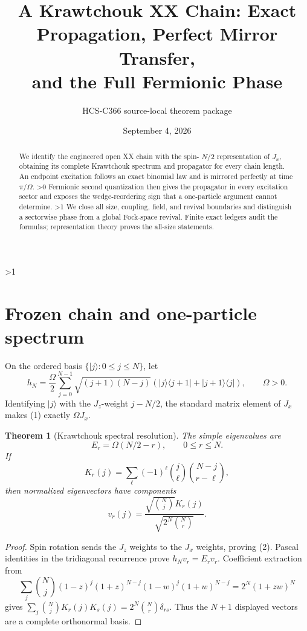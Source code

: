 \documentclass[10pt]{article}
\title{A Krawtchouk XX Chain: Exact Propagation, Perfect Mirror Transfer,\\
and the Full Fermionic Phase}
\author{HCS-C366 source-local theorem package}
\date{September 4, 2026}
\newtheorem{theorem}{Theorem}
\providecommand{\CRevisionRound}{2}
\begin{document}
\maketitle

\begin{abstract}
We identify the engineered open XX chain with the spin-
\(N/2\) representation of \(J_x\), obtaining its complete Krawtchouk spectrum
and propagator for every chain length.  An endpoint excitation follows an
exact binomial law and is mirrored perfectly at time \(\pi/\Omega\).
\ifnum\CRevisionRound>0
Fermionic second quantization then gives the propagator in every excitation
sector and exposes the wedge-reordering sign that a one-particle argument
cannot determine.
\fi
\ifnum\CRevisionRound>1
We close all size, coupling, field, and revival boundaries and distinguish a
sectorwise phase from a global Fock-space revival.
\fi
Finite exact ledgers audit the formulas; representation theory proves the
all-size statements.
\end{abstract}
\ifnum\CRevisionRound>1
\small
\fi

\section{Frozen chain and one-particle spectrum}
On the ordered basis \(\{|j\rangle:0\le j\le N\}\), let
\begin{equation}
h_N=\frac{\Omega}{2}\sum_{j=0}^{N-1}\sqrt{(j+1)(N-j)}
 (|j\rangle\langle j+1|+|j+1\rangle\langle j|),\qquad \Omega>0.
\end{equation}
Identifying \(|j\rangle\) with the \(J_z\)-weight \(j-N/2\), the standard
matrix element of \(J_x\) makes (1) exactly \(\Omega J_x\).

\begin{theorem}[Krawtchouk spectral resolution]
The simple eigenvalues are
\begin{equation}
E_r=\Omega(N/2-r),\qquad 0\le r\le N.
\end{equation}
If
\begin{equation}
K_r(j)=\sum_\ell(-1)^\ell\binom j\ell\binom{N-j}{r-\ell},
\end{equation}
then normalized eigenvectors have components
\begin{equation}
v_r(j)=\frac{\sqrt{\binom Nj}K_r(j)}{\sqrt{2^N\binom Nr}}.
\end{equation}
\end{theorem}

\begin{proof}
Spin rotation sends the \(J_z\) weights to the \(J_x\) weights, proving
(2).  Pascal identities in the tridiagonal recurrence prove
\(h_Nv_r=E_rv_r\).  Coefficient extraction from
\[
\sum_j\binom Nj(1-z)^j(1+z)^{N-j}(1-w)^j(1+w)^{N-j}
=2^N(1+zw)^N
\]
gives
\(\sum_j\binom NjK_r(j)K_s(j)=2^N\binom Nr\delta_{rs}\).
Thus the \(N+1\) displayed vectors are a complete orthonormal basis.
\end{proof}
\end{document}

